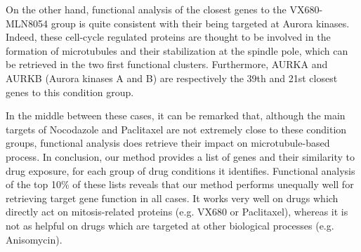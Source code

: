 On the other hand, functional analysis of the closest genes to the VX680-MLN8054 group is quite consistent with their being targeted at Aurora kinases. Indeed, these cell-cycle regulated proteins are thought to be involved in the formation of microtubules and their stabilization at the spindle pole, which can be retrieved in the two first functional clusters. Furthermore, AURKA and AURKB (Aurora kinases A and B) are respectively the 39th and 21st closest genes to this condition group. %

In the middle between these cases, it can be remarked that, although the main targets of Nocodazole and Paclitaxel are not extremely close to these condition groups, functional analysis does retrieve their impact on microtubule-based process. In conclusion, our method provides a list of genes and their similarity to drug exposure, for each group of drug conditions it identifies. Functional analysis of the top 10\% of these lists reveals that our method performs unequally well for retrieving target gene function in all cases. It works very well on drugs which directly act on mitosis-related proteins (e.g. VX680 or Paclitaxel), whereas it is not as helpful on drugs which are targeted at other biological processes (e.g. Anisomycin). 


